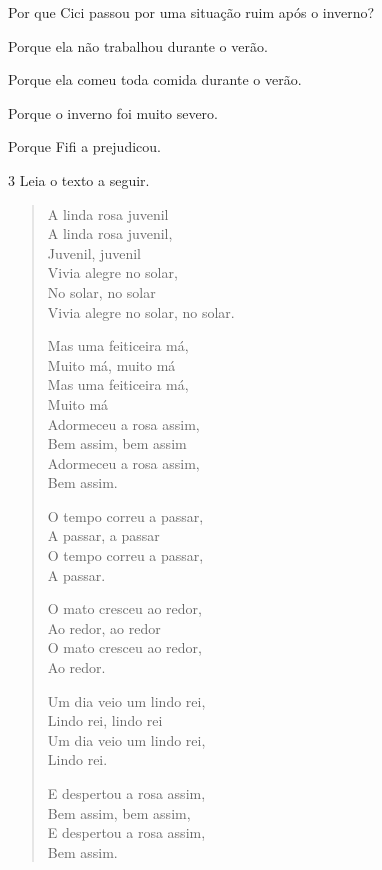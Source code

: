 Por que Cici passou por uma situação ruim após o inverno?

\begin{escolha}
\item Porque ela não trabalhou durante o verão.

\item Porque ela comeu toda comida durante o verão.

\item Porque o inverno foi muito severo.

\item Porque Fifi a prejudicou.
\end{escolha}


\num{3} Leia o texto a seguir.

\begin{myquote}
\begin{verse}
A linda rosa juvenil\\
A linda rosa juvenil,\\
Juvenil, juvenil\\
Vivia alegre no solar,\\
No solar, no solar\\
Vivia alegre no solar, no solar.

Mas uma feiticeira má,\\
Muito má, muito má\\
Mas uma feiticeira má,\\
Muito má\\
Adormeceu a rosa assim,\\
Bem assim, bem assim\\
Adormeceu a rosa assim,\\
Bem assim.

O tempo correu a passar,\\
A passar, a passar\\
O tempo correu a passar,\\
A passar.

O mato cresceu ao redor,\\
Ao redor, ao redor\\
O mato cresceu ao redor,\\
Ao redor.

Um dia veio um lindo rei,\\
Lindo rei, lindo rei\\
Um dia veio um lindo rei,\\
Lindo rei.

E despertou a rosa assim,\\
Bem assim, bem assim,\\
E despertou a rosa assim,\\
Bem assim.
\end{verse}

\end{myquote}

